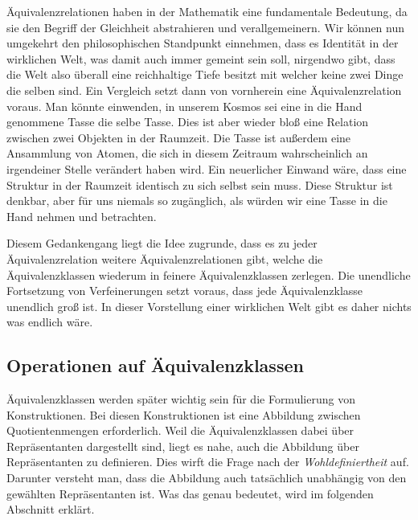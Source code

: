 Äquivalenzrelationen haben in der Mathematik eine fundamentale
Bedeutung, da sie den Begriff der Gleichheit abstrahieren und
verallgemeinern. Wir können nun umgekehrt den philosophischen
Standpunkt einnehmen, dass es Identität in der wirklichen Welt, was
damit auch immer gemeint sein soll, nirgendwo gibt, dass die Welt also
überall eine reichhaltige Tiefe besitzt mit welcher keine zwei Dinge
die selben sind. Ein Vergleich setzt dann von vornherein eine
Äquivalenzrelation voraus. Man könnte einwenden, in unserem Kosmos sei
eine in die Hand genommene Tasse die selbe Tasse. Dies ist aber wieder
bloß eine Relation zwischen zwei Objekten in der Raumzeit. Die Tasse
ist außerdem eine Ansammlung von Atomen, die sich in diesem Zeitraum
wahrscheinlich an irgendeiner Stelle verändert haben wird. Ein
neuerlicher Einwand wäre, dass eine Struktur in der Raumzeit identisch
zu sich selbst sein muss. Diese Struktur ist denkbar, aber für uns
niemals so zugänglich, als würden wir eine Tasse in die
Hand nehmen und betrachten.

Diesem Gedankengang liegt die Idee zugrunde, dass es zu jeder
Äquivalenzrelation weitere Äquivalenzrelationen gibt, welche
die Äquivalenzklassen wiederum in feinere Äquivalenzklassen zerlegen.
Die unendliche Fortsetzung von Verfeinerungen setzt voraus, dass
jede Äquivalenzklasse unendlich groß ist. In dieser Vorstellung einer
wirklichen Welt gibt es daher nichts was endlich wäre.

\subsection{Operationen auf Äquivalenzklassen}

Äquivalenzklassen werden später wichtig sein für die Formulierung von
Konstruktionen. Bei diesen Konstruktionen ist eine Abbildung
zwischen Quotientenmengen erforderlich. Weil die Äquivalenzklassen
dabei über Repräsentanten dargestellt sind, liegt es nahe, auch
die Abbildung über Repräsentanten zu definieren. Dies wirft die
Frage nach der \emph{Wohldefiniertheit} auf. Darunter versteht man,
dass die Abbildung auch tatsächlich unabhängig von den gewählten
Repräsentanten ist. Was das genau bedeutet, wird im folgenden
Abschnitt erklärt.

